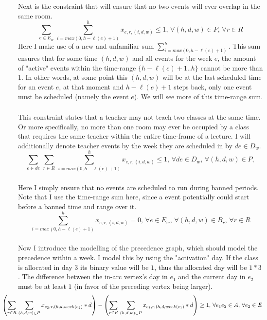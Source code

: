 \documentclass{article}
\begin{document}
    \subsubsection{}
    Next is the constraint that will ensure that no two events will ever overlap in the same room.
    \[\sum_{e \in E_w} \, \sum^h_{i=max(0, h - \ell(e) + 1)} x_{e,r,(i,d,w)} \leq 1, \, \forall (h,d,w) \in P, \, \forall r \in R\]
    Here I make use of a new and unfamiliar sum $\sum^h_{i=max(0, h - \ell(e) + 1)}$.
    This sum ensures that for some time $(h,d,w)$ and all events for the week $e$, the amount of "active" events within the time-range $\{ h - \ell(e) + 1 .. h \}$ cannot be more than $1$.
    In other words, at some point this $(h,d,w)$ will be at the last scheduled time for an event $e$, at that moment and $h - \ell(e) + 1$ steps back, only one event must be scheduled (namely the event $e$).
    We will see more of this time-range sum.
    \subsubsection{}
    This constraint states that a teacher may not teach two classes at the same time.
    Or more specifically, no more than one room may ever be occupied by a class that requires the same teacher within the entire time-frame of a lecture.
    I will additionally denote teacher events by the week they are scheduled in by $de \in D_w$.
    \[\sum_{e \in de} \, \sum_{r \in R} \, \sum^h_{i=max(0, h - \ell(e) + 1)} x_{e,r,(i,d,w)} \leq 1 , \, \forall de \in D_w, \, \forall (h,d,w) \in P,\]
    \subsubsection{}
    Here I simply ensure that no events are scheduled to run during banned periods.
    Note that I use the time-range sum here, since a event potentially could start before a banned time and range over it.
    \[\sum^h_{i=max(0, h - \ell(e) + 1)}  x_{e,r,(i,d,w)} = 0 ,\, \forall e \in E_w ,\, \forall (h,d,w) \in B_r ,\, \forall r \in R\]
    \subsubsection{}
    Now I introduce the modelling of the precedence graph, which should model the precedence within a week.
    I model this by using the "activation" day.
    If the class is allocated in day $3$ its binary value will be $1$, thus the allocated day will be $1*3$.
    The difference between the in-arc vertex's day in $e_1$ and the current day in $e_2$ must be at least $1$ (in favor of the preceding vertex being larger).
    \[\hspace*{-1cm}\left(\sum_{r \in R} \, \sum_{(h,d,w) \in P} x_{e_2,r,(h,d,week(e_2)} * d \right) - \left(\sum_{r \in R} \, \sum_{(h,d,w) \in P} x_{e_1,r,(h,d,week(e_1)} * d \right) \geq 1, \, \forall e_1e_2 \in A, \, \forall e_2 \in E\]
\end{document}

